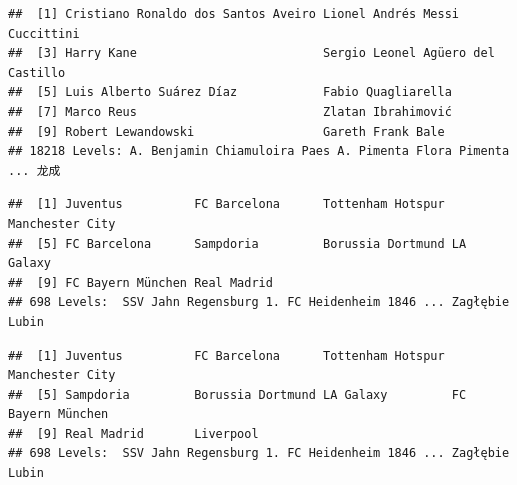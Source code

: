 \documentclass[]{article}
\newenvironment{Shaded}{\begin{snugshade}}{\end{snugshade}}
\newcommand{\CommentTok}[1]{\textcolor[rgb]{0.56,0.35,0.01}{\textit{#1}}}
\newcommand{\DecValTok}[1]{\textcolor[rgb]{0.00,0.00,0.81}{#1}}
\newcommand{\KeywordTok}[1]{\textcolor[rgb]{0.13,0.29,0.53}{\textbf{#1}}}
\newcommand{\NormalTok}[1]{#1}
\newcommand{\OperatorTok}[1]{\textcolor[rgb]{0.81,0.36,0.00}{\textbf{#1}}}
\newcommand{\StringTok}[1]{\textcolor[rgb]{0.31,0.60,0.02}{#1}}
\begin{document}
\begin{verbatim}
##  [1] Cristiano Ronaldo dos Santos Aveiro Lionel Andrés Messi Cuccittini     
##  [3] Harry Kane                          Sergio Leonel Agüero del Castillo  
##  [5] Luis Alberto Suárez Díaz            Fabio Quagliarella                 
##  [7] Marco Reus                          Zlatan Ibrahimović                 
##  [9] Robert Lewandowski                  Gareth Frank Bale                  
## 18218 Levels: A. Benjamin Chiamuloira Paes A. Pimenta Flora Pimenta ... 龙成
\end{verbatim}

\begin{Shaded}
\end{Shaded}

\begin{verbatim}
##  [1] Juventus          FC Barcelona      Tottenham Hotspur Manchester City  
##  [5] FC Barcelona      Sampdoria         Borussia Dortmund LA Galaxy        
##  [9] FC Bayern München Real Madrid      
## 698 Levels:  SSV Jahn Regensburg 1. FC Heidenheim 1846 ... Zagłębie Lubin
\end{verbatim}

\begin{Shaded}
\end{Shaded}

\begin{verbatim}
##  [1] Juventus          FC Barcelona      Tottenham Hotspur Manchester City  
##  [5] Sampdoria         Borussia Dortmund LA Galaxy         FC Bayern München
##  [9] Real Madrid       Liverpool        
## 698 Levels:  SSV Jahn Regensburg 1. FC Heidenheim 1846 ... Zagłębie Lubin
\end{verbatim}

\begin{Shaded}
\end{Shaded}
\end{document}
